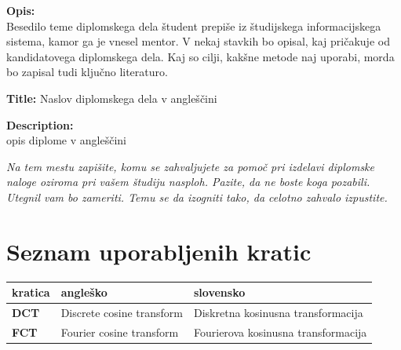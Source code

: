 \documentclass[a4paper,12pt,openright]{book}
\newcommand{\clearemptydoublepage}{\newpage{\pagestyle{empty}\cleardoublepage}}
\begin{document}
\bigskip
\noindent\textbf{Opis:}\\
Besedilo teme diplomskega dela študent prepiše iz študijskega informacijskega sistema, kamor ga je vnesel mentor. 
V nekaj stavkih bo opisal, kaj pričakuje od kandidatovega diplomskega dela. 
Kaj so cilji, kakšne metode naj uporabi, morda bo zapisal tudi ključno literaturo.

\bigskip
\noindent\textbf{Title:} Naslov diplomskega dela v angleščini

\bigskip
\noindent\textbf{Description:}\\
opis diplome v angleščini

\vfill



\vspace{2cm}

\clearemptydoublepage

\thispagestyle{empty}\mbox{}\vfill\null\it%
\noindent
Na tem mestu zapišite, komu se zahvaljujete za pomoč pri izdelavi diplomske naloge oziroma pri vašem študiju nasploh. Pazite, da ne boste koga pozabili. Utegnil vam bo zameriti. Temu se da izogniti tako, da celotno zahvalo izpustite.
\rm\normalfont


\clearemptydoublepage

\pagestyle{empty}
\def\thepage{}%
\tableofcontents{}


\clearemptydoublepage


\chapter*{Seznam uporabljenih kratic}

\noindent\begin{tabular}{p{}|p{}|p{}}    %
  {\bf kratica} & {\bf angleško}                              & {\bf slovensko} \\ \hline
  {\bf DCT}      & Discrete cosine transform               & Diskretna kosinusna transformacija \\
  {\bf FCT}      & Fourier cosine transform               & Fourierova kosinusna transformacija \\
\end{tabular}
\end{document}
